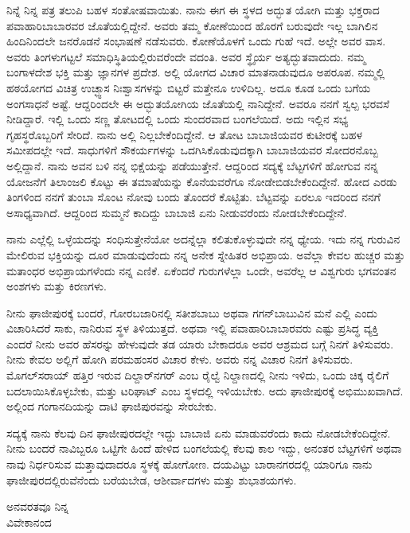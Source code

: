 ನಿನ್ನೆ ನಿನ್ನ ಪತ್ರ ತಲುಪಿ ಬಹಳ ಸಂತೋಷವಾಯಿತು. ನಾನು ಈಗ ಈ ಸ್ಥಳದ ಅದ್ಭುತ ಯೋಗಿ ಮತ್ತು ಭಕ್ತರಾದ ಪವಾಹಾರಿಬಾಬಾರವರ ಜೊತೆಯಲ್ಲಿದ್ದೇನೆ. ಅವರು ತಮ್ಮ ಕೋಣೆಯಿಂದ ಹೊರಗೆ ಬರುವುದೇ ಇಲ್ಲ \enginline{-} ಬಾಗಿಲಿನ ಹಿಂದಿನಿಂದಲೇ ಜನರೊಡನೆ ಸಂಭಾಷಣೆ ನಡೆಸುವರು. ಕೋಣೆಯೊಳಗೆ ಒಂದು ಗುಹೆ ಇದೆ. ಅಲ್ಲೇ ಅವರ ವಾಸ. ಅವರು ತಿಂಗಳುಗಟ್ಟಲೆ ಸಮಾಧಿಸ್ಥಿತಿಯಲ್ಲಿರುವರೆಂದೇ ವದಂತಿ. ಅವರ ಸ್ಥೈರ್ಯ ಅತ್ಯದ್ಭುತವಾದುದು. ನಮ್ಮ ಬಂಗಾಳದೇಶ ಭಕ್ತಿ ಮತ್ತು ಜ್ಞಾನಗಳ ಪ್ರದೇಶ. ಅಲ್ಲಿ ಯೋಗದ ವಿಚಾರ ಮಾತನಾಡುವುದೂ ಅಪರೂಪ. ನಮ್ಮಲ್ಲಿ ಹಠಯೋಗದ ವಿಚಿತ್ರ ಉಚ್ಛ್ವಾಸ ನಿಃಶ್ವಾಸಗಳನ್ನು ಬಿಟ್ಟರೆ ಮತ್ತೇನೂ ಉಳಿದಿಲ್ಲ. ಅದೂ ಕೂಡ ಒಂದು ಬಗೆಯ ಅಂಗಸಾಧನೆ ಅಷ್ಟೆ. ಆದ್ದರಿಂದಲೇ ಈ ಅದ್ಭುತಯೋಗಿಯ ಜೊತೆಯಲ್ಲಿ ನಾನಿದ್ದೇನೆ. ಅವರೂ ನನಗೆ ಸ್ವಲ್ಪ ಭರವಸೆ ನೀಡಿದ್ದಾರೆ. ಇಲ್ಲಿ ಒಂದು ಸಣ್ಣ ತೋಟದಲ್ಲಿ ಒಂದು ಸುಂದರವಾದ ಬಂಗಲೆಯಿದೆ. ಅದು ಇಲ್ಲಿನ ಸಭ್ಯ ಗೃಹಸ್ಥರೊಬ್ಬರಿಗೆ ಸೇರಿದೆ. ನಾನು ಅಲ್ಲಿ ನಿಲ್ಲಬೇಕೆಂದಿದ್ದೇನೆ. ಆ ತೋಟ ಬಾಬಾಜಿಯವರ ಕುಟೀರಕ್ಕೆ ಬಹಳ ಸಮೀಪದಲ್ಲೇ ಇದೆ. ಸಾಧುಗಳಿಗೆ ಸೌಕರ್ಯಗಳನ್ನು ಒದಗಿಸಿಕೊಡುವುದಕ್ಕಾಗಿ ಬಾಬಾಜಿಯವರ ಸೋದರನೊಬ್ಬ ಅಲ್ಲಿದ್ದಾನೆ. ನಾನು ಅವನ ಬಳಿ ನನ್ನ ಭಿಕ್ಷೆಯನ್ನು ಪಡೆಯುತ್ತೇನೆ. ಆದ್ದರಿಂದ ಸದ್ಯಕ್ಕೆ ಬೆಟ್ಟಗಳಿಗೆ ಹೋಗುವ ನನ್ನ ಯೋಜನೆಗೆ ತಿಲಾಂಜಲಿ ಕೊಟ್ಟು ಈ ತಮಾಷೆಯನ್ನು ಕೊನೆಯವರೆಗೂ ನೋಡೇಬಿಡಬೇಕೆಂದಿದ್ದೇನೆ. ಹೋದ ಎರಡು ತಿಂಗಳಿಂದ ನನಗೆ ತುಂಬಾ ಸೊಂಟ ನೋವು ಬಂದು ತೊಂದರೆ ಕೊಟ್ಟಿತು. ಬೆಟ್ಟವನ್ನು ಏರಲೂ ಇದರಿಂದ ನನಗೆ ಅಸಾಧ್ಯವಾಗಿದೆ. ಆದ್ದರಿಂದ ಸುಮ್ಮನೆ ಕಾದಿದ್ದು ಬಾಬಾಜಿ ಏನು ನೀಡುವರೆಂದು ನೋಡಬೇಕೆಂದಿದ್ದೇನೆ.

ನಾನು ಎಲ್ಲೆಲ್ಲಿ ಒಳ್ಳೆಯದನ್ನು ಸಂಧಿಸುತ್ತೇನೆಯೋ ಅದನ್ನೆಲ್ಲಾ ಕಲಿತುಕೊಳ್ಳುವುದೇ ನನ್ನ ಧ್ಯೇಯ. ಇದು ನನ್ನ ಗುರುವಿನ ಮೇಲಿರುವ ಭಕ್ತಿಯನ್ನು ದೂರ ಮಾಡುವುದೆಂದು ನನ್ನ ಅನೇಕ ಸ್ನೇಹಿತರ ಅಭಿಪ್ರಾಯ. ಅವೆಲ್ಲಾ ಕೇವಲ ಹುಚ್ಚರ ಮತ್ತು ಮತಾಂಧರ ಅಭಿಪ್ರಾಯಗಳೆಂದು ನನ್ನ ಎಣಿಕೆ. ಏಕೆಂದರೆ ಗುರುಗಳೆಲ್ಲಾ ಒಂದೇ, ಅವರೆಲ್ಲ ಆ ವಿಶ್ವಗುರು ಭಗವಂತನ ಅಂಶಗಳು ಮತ್ತು ಕಿರಣಗಳು.

ನೀನು ಘಾಜೀಪುರಕ್ಕೆ ಬಂದರೆ, ಗೋರಬಜಾರಿನಲ್ಲಿ ಸತೀಶಬಾಬು ಅಥವಾ ಗಗನ್‌ಬಾಬುವಿನ ಮನೆ ಎಲ್ಲಿ ಎಂದು ವಿಚಾರಿಸಿದರೆ ಸಾಕು, ನಾನಿರುವ ಸ್ಥಳ ತಿಳಿಯುತ್ತದೆ. ಅಥವಾ ಇಲ್ಲಿ ಪವಾಹಾರಿಬಾಬಾರವರು ಎಷ್ಟು ಪ್ರಸಿದ್ಧ ವ್ಯಕ್ತಿ ಎಂದರೆ ನೀನು ಅವರ ಹೆಸರನ್ನು ಹೇಳುವುದೇ ತಡ ಯಾರು ಬೇಕಾದರೂ ಅವರ ಆಶ್ರಮದ ಬಗ್ಗೆ ನಿನಗೆ ತಿಳಿಸುವರು. ನೀನು ಕೇವಲ ಅಲ್ಲಿಗೆ ಹೋಗಿ ಪರಮಹಂಸರ ವಿಚಾರ ಕೇಳು. ಅವರು ನನ್ನ ವಿಚಾರ ನಿನಗೆ ತಿಳಿಸುವರು. ಮೊಗಲ್‌ಸರಾಯ್ ಹತ್ತಿರ ಇರುವ ದಿಲ್ದಾರ್‌ನಗರ್ ಎಂಬ ರೈಲ್ವೆ ನಿಲ್ದಾಣದಲ್ಲಿ ನೀನು ಇಳಿದು, ಒಂದು ಚಿಕ್ಕ ರೈಲಿಗೆ ಬದಲಾಯಿಸಿಕೊಳ್ಳಬೇಕು, ಮತ್ತು ಟರಿಘಾಟ್ ಎಂಬ ಸ್ಥಳದಲ್ಲಿ ಇಳಿಯಬೇಕು. ಅದು ಘಾಜೀಪುರಕ್ಕೆ ಅಭಿಮುಖವಾಗಿದೆ. ಅಲ್ಲಿಂದ ಗಂಗಾನದಿಯನ್ನು ದಾಟಿ ಘಾಜಿಪುರವನ್ನು ಸೇರಬೇಕು.

ಸದ್ಯಕ್ಕೆ ನಾನು ಕೆಲವು ದಿನ ಘಾಜೀಪುರದಲ್ಲೇ ಇದ್ದು ಬಾಬಾಜಿ ಏನು ಮಾಡುವರೆಂದು ಕಾದು ನೋಡಬೇಕೆಂದಿದ್ದೇನೆ. ನೀನು ಬಂದರೆ ನಾವಿಬ್ಬರೂ ಒಟ್ಟಿಗೇ ಹಿಂದೆ ಹೇಳಿದ ಬಂಗಲೆಯಲ್ಲಿ ಕೆಲವು ಕಾಲ ಇದ್ದು, ಅನಂತರ ಬೆಟ್ಟಗಳಿಗೆ ಅಥವಾ ನಾವು ನಿರ್ಧರಿಸುವ ಮತ್ತಾವುದಾದರೂ ಸ್ಥಳಕ್ಕೆ ಹೋಗೋಣ. ದಯವಿಟ್ಟು ಬಾರಾನಗರದಲ್ಲಿ ಯಾರಿಗೂ ನಾನು ಘಾಜೀಪುರದಲ್ಲಿರುವೆನೆಂದು ಬರೆಯಬೇಡ, ಆಶೀರ್ವಾದಗಳು ಮತ್ತು ಶುಭಾಶಯಗಳು.

{\flushright
ಅನವರತವೂ ನಿನ್ನ\\ವಿವೇಕಾನಂದ\par}

